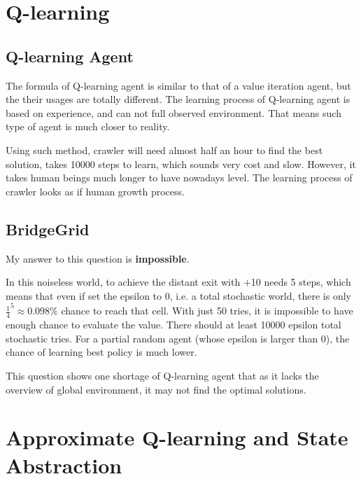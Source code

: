 \documentclass[12pt,a4paper]{article}
\begin{document}
	\section{Q-learning}
	\subsection{Q-learning Agent}
	The formula of Q-learning agent is similar to that of a value iteration agent, but the their usages are totally different. The learning process of Q-learning agent is based on experience, and can not full observed environment. That means such type of agent is much closer to reality.\par
	Using such method, crawler will need almost half an hour to find the best solution, takes 10000 steps to learn, which sounds very cost and slow. However, it takes human beings much longer to have nowadays level. The learning process of crawler looks as if human growth process.
	\subsection{BridgeGrid}
	My answer to this question is \textbf{impossible}.\par
	In this noiseless world, to achieve the distant exit with +10 needs 5 steps, which means that even if set the epsilon to 0, i.e. a total stochastic world, there is only $ \frac{1}{4}^5 \approx 0.098\% $ chance to reach that cell. With just 50 tries, it is impossible to have enough chance to evaluate the value. There should at least 10000 epsilon total stochastic tries. For a partial random agent (whose epsilon is larger than 0), the chance of learning best policy is much lower.\par
	This question shows one shortage of Q-learning agent that as it lacks the overview of global environment, it may not find the optimal solutions. 
	\section{Approximate Q-learning and State Abstraction}
\end{document}
